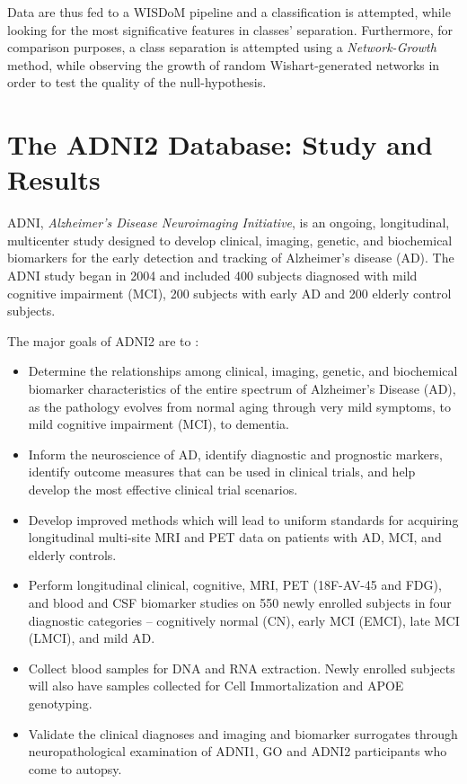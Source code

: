 \documentclass[12pt,openright,twoside,a4paper]{book}
\begin{document}
Data are thus fed to a WISDoM pipeline and a classification is attempted, while looking for the most significative features in classes' separation.
Furthermore, for comparison purposes, a class separation is attempted using a \textit{Network-Growth} method, while observing  the growth of random Wishart-generated networks in order to test the quality of the null-hypothesis.
\clearpage

\section{The ADNI2 Database: Study and Results}

ADNI, \textit{Alzheimer's Disease Neuroimaging Initiative}, is an ongoing, longitudinal, multicenter study designed to develop clinical, imaging, genetic, and biochemical biomarkers for the early detection and tracking of Alzheimer’s disease (AD). The ADNI study began in 2004 and included 400 subjects diagnosed with mild cognitive impairment (MCI), 200 subjects with early AD and 200 elderly control subjects.

The major goals of ADNI2 are to \cite{Adni}:
\begin{itemize}
\item Determine the relationships among clinical, imaging, genetic, and biochemical biomarker characteristics of the entire spectrum of Alzheimer’s Disease (AD), as the pathology evolves from normal aging through very mild symptoms, to mild cognitive impairment (MCI), to dementia.

\item Inform the neuroscience of AD, identify diagnostic and prognostic markers, identify outcome measures that can be used in clinical trials, and help develop the most effective clinical trial scenarios.

\item Develop improved methods which will lead to uniform standards for acquiring longitudinal multi-site MRI and PET data on patients with AD, MCI, and elderly controls.

\item Perform longitudinal clinical, cognitive, MRI, PET (18F-AV-45 and
FDG), and blood and CSF biomarker studies on 550 newly enrolled
subjects in four diagnostic categories – cognitively normal (CN),
early MCI (EMCI), late MCI (LMCI), and mild AD. 

\item Collect blood samples for DNA and RNA extraction. Newly enrolled subjects will also have samples collected for Cell Immortalization and APOE genotyping.

\item Validate the clinical diagnoses and imaging and biomarker surrogates through neuropathological examination of ADNI1, GO and ADNI2 participants who come to autopsy.

\end{itemize}
\end{document}
